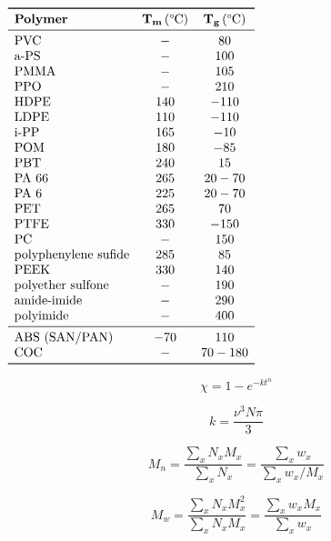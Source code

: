 \documentclass[a4paper, 11pt]{article}
\begin{document}
\begin{table}[htp]
\centering
$
\begin{array}{lcc}
\toprule
\textbf{Polymer} & \mathbf{T_m} \, (\text{°C}) & \mathbf{T_g} \, (\text{°C}) \\
\midrule 
\text{PVC} & - & 80 \\
\text{a-PS} & - & 100 \\
\text{PMMA} & - & 105 \\
\text{PPO} & - & 210 \\
\text{HDPE} & 140 & -110 \\
\text{LDPE} & 110 & -110 \\
\text{i-PP} & 165 & -10 \\
\text{POM} & 180 & -85 \\
\text{PBT} & 240 & 15 \\
\text{PA 66} & 265 & 20-70 \\
\text{PA 6} & 225 & 20-70 \\
\text{PET} & 265 & 70 \\
\text{PTFE} & 330 & -150 \\
\text{PC} & - & 150 \\
\text{polyphenylene sufide} & 285 & 85 \\
\text{PEEK} & 330 & 140 \\
\text{polyether sulfone} & - & 190 \\
\text{amide-imide} & - & 290 \\
\text{polyimide} & - & 400 \\
\midrule
\text{ABS (SAN/PAN)} & -70 & 110 \\
\text{COC} & - & 70-180 \\
\bottomrule 
\end{array}
$
\end{table}

\begin{equation}
\chi = 1-e^{-kt^n}
\end{equation}

\begin{equation}
	k = \frac{\nu^3 N \pi}{3}
\end{equation}

\begin{equation}
	M_n = \frac{\sum_x N_x M_x}{\sum_x N_x} = \frac{\sum_x w_x}{\sum_x w_x/M_x}
\end{equation}

\begin{equation}
	M_w = \frac{\sum_x N_x M_x^2}{\sum_x N_x M_x}=\frac{\sum_x w_x M_x}{\sum_x w_x}
\end{equation}
\end{document}
